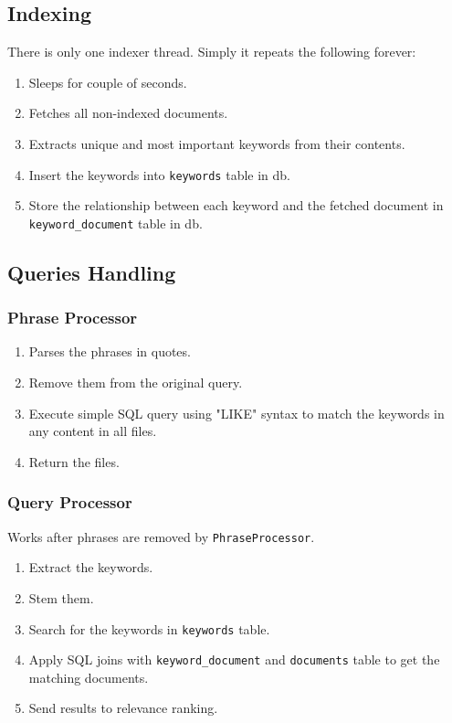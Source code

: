 \documentclass[12pt]{article}
\begin{document}
\subsection{Indexing}
There is only one indexer thread. 
Simply it repeats the following forever:
\begin{enumerate}
  \item Sleeps for couple of seconds.
  \item Fetches all non-indexed documents.
  \item Extracts unique and most important keywords from their contents.
  \item Insert the keywords into \texttt{keywords} table in db.
  \item Store the relationship between each keyword and the fetched document in \texttt{keyword\_document} table in db.
\end{enumerate}

\subsection{Queries Handling}
\subsubsection{Phrase Processor}
\begin{enumerate}
  \item Parses the phrases in quotes.
  \item Remove them from the original query.
  \item Execute simple SQL query using "LIKE" syntax to match the keywords in any content in all files.
  \item Return the files.
\end{enumerate}

\subsubsection{Query Processor}
Works after phrases are removed by \texttt{PhraseProcessor}.
\begin{enumerate}
  \item Extract the keywords.
  \item Stem them.
  \item Search for the keywords in \texttt{keywords} table.
  \item Apply SQL joins with \texttt{keyword\_document} and \texttt{documents} table to get the matching documents.
  \item Send results to relevance ranking.
\end{enumerate}
\end{document}
